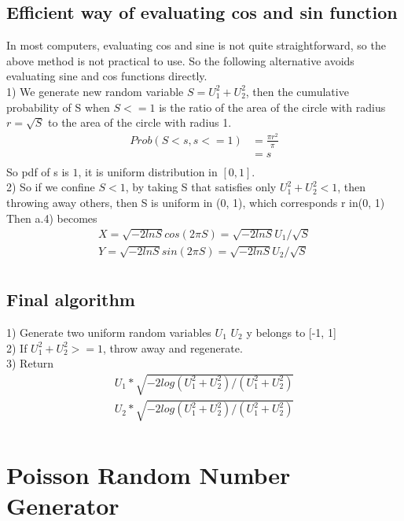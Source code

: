 \documentclass[a4paper]{article}
\begin{document}
\subsection{Efficient way of evaluating cos and sin function}
In most computers, evaluating cos and sine is not quite straightforward, so the above method is not practical to use. So the following alternative avoids evaluating sine and cos functions directly.\\
1) We generate new random variable $S = U_1^2 + U_2^2$, then the cumulative probability of S when $S<=1$ is the ratio of the area of the circle with radius $r = \sqrt{S}$ to the area of the circle with radius 1.
\begin{align*}
	Prob(S<s, s<=1) &= \frac{\pi r^2}{\pi} \\
	& = s \\
\end{align*}
So pdf of s is $1$, it is uniform distribution in $[0, 1]$.\\
2) So if we confine $S<1$, by taking S that satisfies only $U_1^2 + U_2^2 <1$, then throwing away others, then S is uniform in (0, 1), which corresponds r in(0, 1)\\
Then a.4) becomes\\
\begin{align*}
X = \sqrt{-2 ln S} cos(2\pi S) =\sqrt{-2 ln S} U_1/\sqrt{S} \\
Y = \sqrt{-2 ln S} sin(2\pi S) = \sqrt{-2 ln S} U_2/\sqrt{S} \\
\end{align*}


\subsection{Final algorithm} 
1)	Generate two uniform random variables $U_1$ $U_2$ y belongs to [-1, 1]\\
2)	If $U_1^2 + U_2^2 >=1$, throw away and regenerate.\\
3)	Return\\ 
\begin{align*}
    U_1 * \sqrt{-2 log (U_1^2 + U_2^2) / (U_1^2 + U_2 ^2)}\\
    U_2 * \sqrt{-2 log (U_1^2 + U_2^2) / (U_1^2 + U_2 ^2)}\\
\end{align*}
\section{Poisson Random Number Generator}
\end{document}
